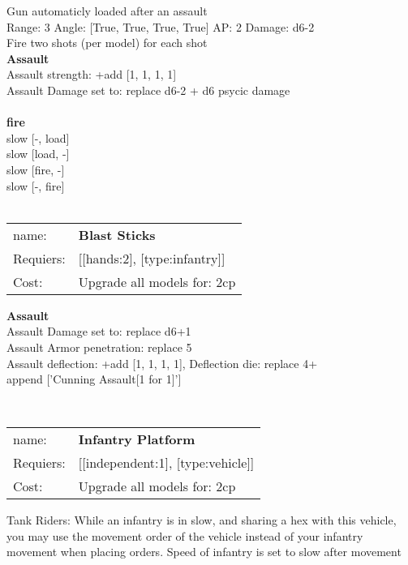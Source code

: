 Gun automaticly loaded after an assault\\ 


Range: 3  Angle: [True, True, True, True] AP: 2 Damage: d6-2 \\
Fire two shots (per model) for each shot\\ 



{\bf Assault} \ \\
Assault strength: +add [1, 1, 1, 1] 
\\ 
Assault Damage set to: replace d6-2 + d6 psycic damage
\\ 



\ \\ {\bf fire } \\
slow [-, load] \\
slow [load, -] \\
slow [fire, -] \\
slow [-, fire] \\

\ \\
\begin{tabular}{ll}
name: & {\bf Blast Sticks } \\
Requiers: & [[hands:2], [type:infantry]] \\
Cost: & Upgrade all models for: 2cp \\
\end{tabular}





{\bf Assault} \ \\
Assault Damage set to: replace d6+1
\\ 
Assault Armor penetration: replace 5 
\\ 
Assault deflection: +add [1, 1, 1, 1], Deflection die: replace 4+
\\ 

append ['Cunning Assault[1 for 1]']


\ \\
\begin{tabular}{ll}
name: & {\bf Infantry Platform } \\
Requiers: & [[independent:1], [type:vehicle]] \\
Cost: & Upgrade all models for: 2cp \\
\end{tabular}

Tank Riders: While an infantry is in slow, and sharing a hex with this vehicle, you may use the movement order of the vehicle instead of your infantry movement when placing orders. Speed of infantry is set to slow after movement\\ 









